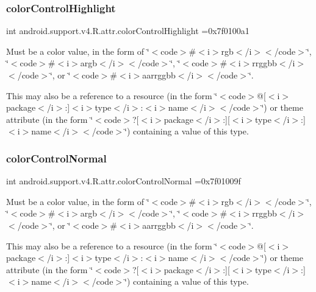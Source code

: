 \subsubsection{\texorpdfstring{color\+Control\+Highlight}{colorControlHighlight}}
{\footnotesize\ttfamily int android.\+support.\+v4.\+R.\+attr.\+color\+Control\+Highlight =0x7f0100a1\hspace{0.3cm}{\ttfamily [static]}}

Must be a color value, in the form of \char`\"{}$<$code$>$\#$<$i$>$rgb$<$/i$>$$<$/code$>$\char`\"{}, \char`\"{}$<$code$>$\#$<$i$>$argb$<$/i$>$$<$/code$>$\char`\"{}, \char`\"{}$<$code$>$\#$<$i$>$rrggbb$<$/i$>$$<$/code$>$\char`\"{}, or \char`\"{}$<$code$>$\#$<$i$>$aarrggbb$<$/i$>$$<$/code$>$\char`\"{}. 

This may also be a reference to a resource (in the form \char`\"{}$<$code$>$@\mbox{[}$<$i$>$package$<$/i$>$\+:\mbox{]}$<$i$>$type$<$/i$>$\+:$<$i$>$name$<$/i$>$$<$/code$>$\char`\"{}) or theme attribute (in the form \char`\"{}$<$code$>$?\mbox{[}$<$i$>$package$<$/i$>$\+:\mbox{]}\mbox{[}$<$i$>$type$<$/i$>$\+:\mbox{]}$<$i$>$name$<$/i$>$$<$/code$>$\char`\"{}) containing a value of this type. \mbox{\label{classandroid_1_1support_1_1v4_1_1R_1_1attr_a0f9de63df4df6b2c04f5544914e7b6ae}} 
\subsubsection{\texorpdfstring{color\+Control\+Normal}{colorControlNormal}}
{\footnotesize\ttfamily int android.\+support.\+v4.\+R.\+attr.\+color\+Control\+Normal =0x7f01009f\hspace{0.3cm}{\ttfamily [static]}}

Must be a color value, in the form of \char`\"{}$<$code$>$\#$<$i$>$rgb$<$/i$>$$<$/code$>$\char`\"{}, \char`\"{}$<$code$>$\#$<$i$>$argb$<$/i$>$$<$/code$>$\char`\"{}, \char`\"{}$<$code$>$\#$<$i$>$rrggbb$<$/i$>$$<$/code$>$\char`\"{}, or \char`\"{}$<$code$>$\#$<$i$>$aarrggbb$<$/i$>$$<$/code$>$\char`\"{}. 

This may also be a reference to a resource (in the form \char`\"{}$<$code$>$@\mbox{[}$<$i$>$package$<$/i$>$\+:\mbox{]}$<$i$>$type$<$/i$>$\+:$<$i$>$name$<$/i$>$$<$/code$>$\char`\"{}) or theme attribute (in the form \char`\"{}$<$code$>$?\mbox{[}$<$i$>$package$<$/i$>$\+:\mbox{]}\mbox{[}$<$i$>$type$<$/i$>$\+:\mbox{]}$<$i$>$name$<$/i$>$$<$/code$>$\char`\"{}) containing a value of this type. \mbox{\label{classandroid_1_1support_1_1v4_1_1R_1_1attr_af2f3bec0516073795645916be3a7eca5}} 
